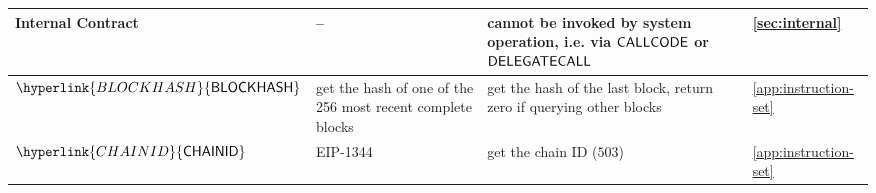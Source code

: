 \documentclass[fleqn,10pt]{SelfArx} %
\begin{document}
\begin{center}
\begin{tabu}{l X X l}
			\midrule
			Internal Contract & -- & cannot be invoked by system operation, i.e. via $\mathsf{CALLCODE}$ or $\mathsf{DELEGATECALL}$  
			& \cref{sec:internal} \smallskip\\
			\hline
			$\hyperlink{BLOCKHASH}{\op{BLOCKHASH}}$ 	&  get the hash of one of the 256 most recent complete blocks	& get the hash of the last block, return zero if querying other blocks	& \cref{app:instruction-set}\\
			\hline
			$\hyperlink{CHAINID}{\op{CHAINID}}$ 	& EIP-1344	&  get the {\name} chain ID ($503$)	&  \cref{app:instruction-set}\\
			\bottomrule

	\end{tabu}
\end{center}
\end{document}

